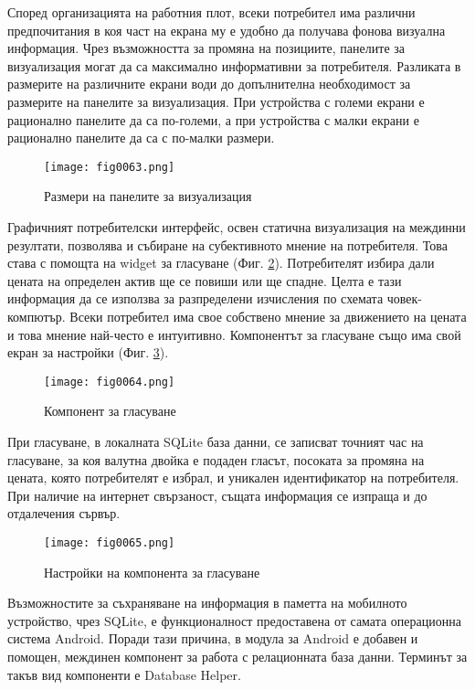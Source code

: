 Според организацията на работния плот, всеки потребител има различни предпочитания в коя част на екрана му е удобно да получава фонова визуална информация. Чрез възможността за промяна на позициите, панелите за визуализация могат да са максимално информативни за потребителя. Разликата в размерите на различните екрани води до допълнителна необходимост за размерите на панелите за визуализация. При устройства с големи екрани е рационално панелите да са по-големи, а при устройства с малки екрани е рационално панелите да са с по-малки размери. 

\begin{figure}[H]
  \centering
  \texttt{[image: fig0063.png]}
  \caption{Размери на панелите за визуализация}
\label{fig0063}
\end{figure}

Графичният потребителски интерфейс, освен статична визуализация на междинни резултати, позволява и събиране на субективното мнение на потребителя. Това става с помощта на widget за гласуване (Фиг. \ref{fig0064}). Потребителят избира дали цената на определен актив ще се повиши или ще спадне. Целта е тази информация да се използва за разпределени изчисления по схемата човек-компютър. Всеки потребител има свое собствено мнение за движението на цената и това мнение най-често е интуитивно.  Компонентът за гласуване също има свой екран за настройки (Фиг. \ref{fig0065}).

\begin{figure}[H]
  \centering
  \texttt{[image: fig0064.png]}
  \caption{Компонент за гласуване}
\label{fig0064}
\end{figure}

При гласуване, в локалната SQLite база данни, се записват точният час на гласуване, за коя валутна двойка е подаден гласът, посоката за промяна на цената, която потребителят е избрал, и уникален идентификатор на потребителя. При наличие на интернет свързаност, същата информация се изпраща и до отдалечения сървър. 

\begin{figure}[H]
  \centering
  \texttt{[image: fig0065.png]}
  \caption{Настройки на компонента за гласуване}
\label{fig0065}
\end{figure}

Възможностите за съхраняване на информация в паметта на мобилното устройство, чрез SQLite, е функционалност предоставена от самата операционна система Android. Поради тази причина, в модула за Android е добавен и помощен, междинен компонент за работа с релационната база данни. Терминът за такъв вид компоненти е Database Helper.

